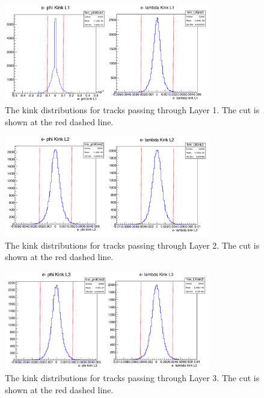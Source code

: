 \begin{figure}[H]
  \centering
      \includegraphics[width=0.8\textwidth]{pics/appendix/kink1.png}
  \caption[Kink distributions for Layer 1]{The kink distributions for tracks passing through Layer 1. The cut is shown at the red dashed line.}
  \label{fig:kink1}
\end{figure} 
\begin{figure}[H]
  \centering
      \includegraphics[width=0.8\textwidth]{pics/appendix/kink2.png}
  \caption[Kink distributions for Layer 2]{The kink distributions for tracks passing through Layer 2. The cut is shown at the red dashed line.}
  \label{fig:kink2}
\end{figure} 
\begin{figure}[H]
  \centering
      \includegraphics[width=0.8\textwidth]{pics/appendix/kink3.png}
  \caption[Kink distributions for Layer 3]{The kink distributions for tracks passing through Layer 3. The cut is shown at the red dashed line.}
  \label{fig:kink3}
\end{figure} 

